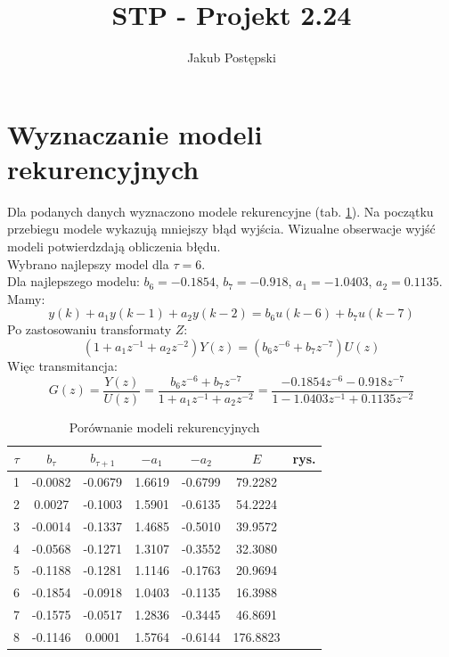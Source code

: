 \documentclass[a4paper, 10pt]{article}
\author{Jakub Postępski}
\title{STP - Projekt 2.24}
\begin{document}
	\maketitle
	\section{Wyznaczanie modeli rekurencyjnych}
	Dla podanych danych wyznaczono modele rekurencyjne (tab. \ref{tab:z1}). Na początku przebiegu modele wykazują mniejszy błąd wyjścia. Wizualne obserwacje wyjść modeli potwierdzdają obliczenia błędu. \\
	Wybrano najlepszy model dla $\tau=6$. \\
	Dla najlepszego modelu: $b_6 = -0.1854$, $b_7=-0.918$, $a_1=-1.0403$, $a_2=0.1135$.\\
	Mamy:
	\[y(k)+a_1y(k-1) + a_2y(k-2)=b_6u(k-6)+b_7u(k-7)\]
	Po zastosowaniu transformaty $Z$:
	\[(1+a_1z^{-1} + a_2z^{-2})Y(z)=(b_6z^{-6}+b_7z^{-7})U(z)\]
	Więc transmitancja:
	\[G(z)=\frac{Y(z)}{U(z)}=\frac{b_6z^{-6}+b_7z^{-7}}{1+a_1z^{-1} + a_2z^{-2}}=\frac{-0.1854z^{-6}-0.918z^{-7}}{1-1.0403z^{-1} + 0.1135z^{-2}}\]
	\begin{table}[H]
	\begin{tabular}{|c|c|c|c|c|c|c|}
	\hline 
	$\tau$ & $b_\tau$ & $b_{\tau+1}$ & $-a_1$ & $-a_2$ & $E$ & rys. \\ 
	\hline 
	 1 & -0.0082 & -0.0679 &  1.6619 & -0.6799
	  & 79.2282 & \\ 
	\hline 
	2 & 0.0027 & -0.1003
	  &  1.5901 & -0.6135 & 54.2224 & \\ 
	\hline 3 & -0.0014 & -0.1337 &  1.4685  & -0.5010 & 39.9572 & \\ 
	\hline 
	4 & -0.0568 & -0.1271 & 1.3107 & -0.3552
	  & 32.3080  &\\ 
	\hline 
 5 & -0.1188 & -0.1281 & 1.1146 &  -0.1763 & 20.9694 & \\ 
	\hline 
	6 & -0.1854  &  -0.0918 &  1.0403  & -0.1135 & 16.3988 & \\ 
	\hline 
	7 & -0.1575 & -0.0517  & 1.2836 & -0.3445  & 46.8691
	& \\ 
	\hline
	8 & -0.1146 & 0.0001  & 1.5764 & -0.6144 & 176.8823 & \\ 
	\hline 
	\end{tabular}
	\label{tab:z1}
	\caption{Porównanie modeli rekurencyjnych}
	\end{table}
	
\end{document}
